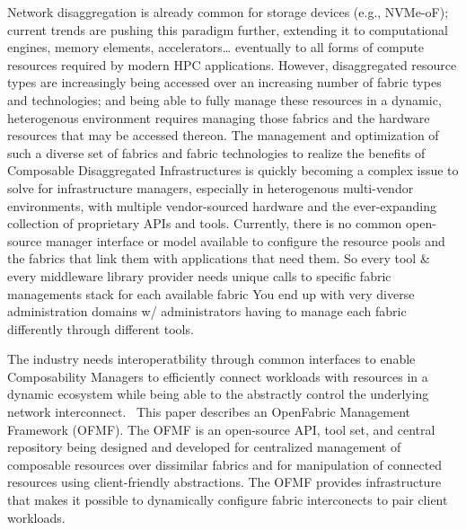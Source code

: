 Network disaggregation is already common for storage devices (e.g., NVMe-oF); current trends are pushing this paradigm further, extending it to computational engines, memory elements, accelerators… eventually to all forms of compute resources required by modern HPC applications.  However, disaggregated resource types are increasingly being accessed over an increasing number of fabric types and technologies; and being able to fully manage these resources in a dynamic, heterogenous environment requires managing those fabrics and the hardware resources that may be accessed thereon. The management and optimization of such a diverse set of fabrics and fabric technologies to realize the benefits of Composable Disaggregated Infrastructures is quickly becoming a complex issue to solve for infrastructure managers, especially in heterogenous multi-vendor environments, with multiple vendor-sourced hardware and the ever-expanding collection of proprietary APIs and tools. Currently, there is no common open-source manager interface or model available to configure the resource pools and the fabrics that link them with applications that need them. So every tool & every middleware library provider needs unique calls to specific fabric managements stack for each available fabric You end up with very diverse administration domains w/ administrators having to manage each fabric differently through different tools.

The industry needs interoperatbility through common interfaces to enable Composability Managers to efficiently connect workloads with resources in a dynamic ecosystem while being able to the abstractly control the underlying network interconnect.  This paper describes an OpenFabric Management Framework (OFMF).  The OFMF is an open-source API, tool set, and central repository being designed and developed for centralized management of composable resources over dissimilar fabrics and for manipulation of connected resources using client-friendly abstractions.  The OFMF provides infrastructure that makes it possible to dynamically configure fabric interconects to pair client workloads.

  


